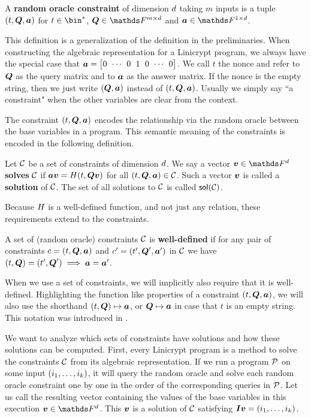 \begin{defn}
A \textbf{random oracle constraint} of dimension $\base$ taking $m$ inputs is a tuple $(t, \v Q, \v a)$ for
$t \in \bin^*$, $\Q \in \F^{m \times \base}$ and $\va \in \F^{1 \times \base}$.
\end{defn}

This definition is a generalization of the definition in the preliminaries.
When constructing the algebraic representation for a Linicrypt program,
we always have the special case that $\va = \m{0&\cdots&0&1&0&\cdots&0}$.
We call $t$ the nonce and refer to $\Q$ as the query matrix and to $\va$ as the answer matrix.
If the nonce is the empty string, then we just write $(\Q, \va)$ instead of $(t, \Q, \va)$.
Usually we simply say ``a constraint" when the other variables are clear from the context.

The constraint $(t, \Q, \va)$ encodes the relationship via the random oracle between the base variables in a program.
This semantic meaning of the constraints is encoded in the following definition.
\begin{defn}
    Let $\C$ be a set of constraints of dimension $\base$.
    We say a vector $\vv \in \Base$ \textbf{solves} $\C$ if
    $\va \vv = \H(t, \Q \vv)$ for all $(t, \Q, \va) \in \C$.
    Such a vector $\vv$ is called a \textbf{solution} of $\C$.
    The set of all solutions to $\C$ is called $\sol(\C)$.
\end{defn}

Because $\H$ is a well-defined function,
and not just any relation,
these requirements extend to the constraints.

\begin{defn}
A set of (random oracle) constraints $\C$ is \textbf{well-defined} if for any pair of constraints 
$c = (t, \Q, \va)$ and $c' = (t', \Q', \va')$ in $\C$ we have $(t,\Q) = (t', \Q') \implies \va = \va'$.
\end{defn}

When we use a set of constraints, we will implicitly also require that it is well-defined.
Highlighting the function like properties of a constraint $(t, \Q, \va)$,
we will also use the shorthand $(t,\Q) \mapsto \va$, or $\Q \mapsto \va$ in case that $t$ is an empty string.
This notation was introduced in \cite{EPRINT:HolRosRoy22}.

We want to analyze which sets of constraints have solutions and how these solutions can be computed.
First, every Linicrypt program is a method to solve the constraints $\C$ from its algebraic representation.
If we run a program $\P$ on some input $(\dts i k)$,
it will query the random oracle
and solve each random oracle constraint one by one in the order of the corresponding queries in $\P$.
Let us call the resulting vector containing the values of the base variables in this execution $\vv \in \Fsp$.
This $\vv$ is a solution of $\C$ satisfying $\I\vv = (\dts i k)$.

